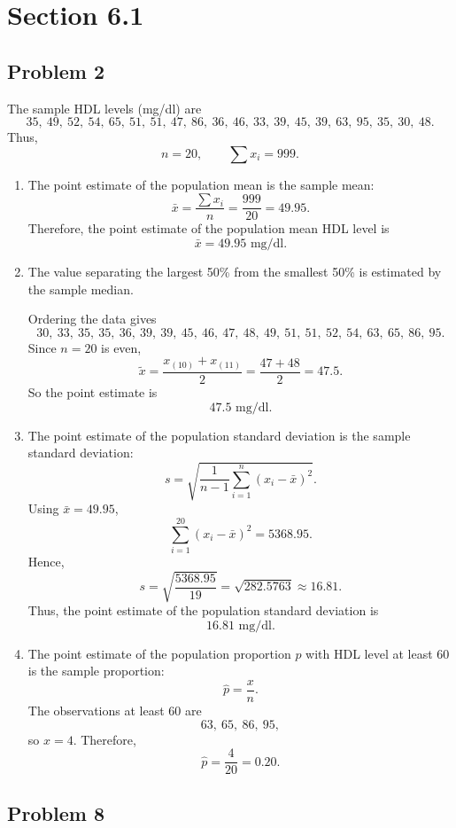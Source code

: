 \documentclass[11pt]{article}
\begin{document}
\section*{Section 6.1}

\subsection*{Problem 2}

The sample HDL levels (mg/dl) are
\[
35,\ 49,\ 52,\ 54,\ 65,\ 51,\ 51,\ 47,\ 86,\ 36,\ 46,\ 33,\ 39,\ 45,\ 39,\ 63,\ 95,\ 35,\ 30,\ 48.
\]
Thus,
\[
n=20, \qquad \sum x_i = 999.
\]

\begin{enumerate}
\item[(a)] The point estimate of the population mean is the sample mean:
\[
\bar{x}=\frac{\sum x_i}{n}=\frac{999}{20}=49.95.
\]
Therefore, the point estimate of the population mean HDL level is
\[
\bar{x}=49.95\text{ mg/dl}.
\]

\item[(b)] The value separating the largest 50\% from the smallest 50\% is estimated by the sample median.

Ordering the data gives
\[
30,\ 33,\ 35,\ 35,\ 36,\ 39,\ 39,\ 45,\ 46,\ 47,\ 48,\ 49,\ 51,\ 51,\ 52,\ 54,\ 63,\ 65,\ 86,\ 95.
\]
Since $n=20$ is even,
\[
\tilde{x}=\frac{x_{(10)}+x_{(11)}}{2}=\frac{47+48}{2}=47.5.
\]
So the point estimate is
\[
47.5\text{ mg/dl}.
\]

\item[(c)] The point estimate of the population standard deviation is the sample standard deviation:
\[
s=\sqrt{\frac{1}{n-1}\sum_{i=1}^{n}(x_i-\bar{x})^2}.
\]
Using $\bar{x}=49.95$,
\[
\sum_{i=1}^{20}(x_i-\bar{x})^2=5368.95.
\]
Hence,
\[
s=\sqrt{\frac{5368.95}{19}}=\sqrt{282.5763}\approx 16.81.
\]
Thus, the point estimate of the population standard deviation is
\[
16.81\text{ mg/dl}.
\]

\item[(d)] The point estimate of the population proportion $p$ with HDL level at least $60$ is the sample proportion:
\[
\hat{p}=\frac{x}{n}.
\]
The observations at least $60$ are
\[
63,\ 65,\ 86,\ 95,
\]
so $x=4$. Therefore,
\[
\hat{p}=\frac{4}{20}=0.20.
\]
\end{enumerate}

\subsection*{Problem 8}
\end{document}
